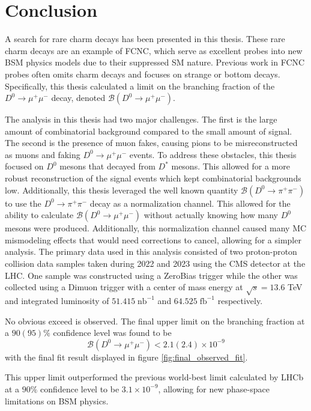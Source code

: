 \chapter{Conclusion}
\label{ch:5}

A search for rare charm decays has been presented in this thesis. These rare charm decays are an example of FCNC, which serve as excellent probes into new BSM physics models due to their suppressed SM nature. Previous work in FCNC probes often omits charm decays and focuses on strange or bottom decays. Specifically, this thesis calculated a limit on the branching fraction of the $D^0 \to \mu^+ \mu^-$ decay, denoted $\mathcal{B}(D^0 \to \mu^+ \mu^-)$. 

The analysis in this thesis had two major challenges. The first is the large amount of combinatorial background compared to the small amount of signal. The second is the presence of muon fakes, causing pions to be misreconstructed as muons and faking $D^0 \to \mu^+ \mu^-$ events. To address these obstacles, this thesis focused on $D^0$ mesons that decayed from $D^*$ mesons. This allowed for a more robust reconstruction of the signal events which kept combinatorial backgrounds low. Additionally, this thesis leveraged the well known quantity $\mathcal{B}(D^0 \to \pi^+ \pi^-)$ to use the $D^0 \to \pi^+ \pi^-$ decay as a normalization channel. This allowed for the ability to calculate $\mathcal{B}(D^0 \to \mu^+ \mu^-)$ without actually knowing how many $D^0$ mesons were produced. Additionally, this normalization channel caused many MC mismodeling effects that would need corrections to cancel, allowing for a simpler analysis. The primary data used in this analysis consisted of two proton-proton collision data samples taken during 2022 and 2023 using the CMS detector at the LHC. One sample was constructed using a ZeroBias trigger while the other was collected using a Dimuon trigger with a center of mass energy at $\sqrt{s} = 13.6$ TeV and integrated luminosity of $51.415\; \text{nb}^{-1}$ and $64.525\; \text{fb}^{-1}$ respectively. 

No obvious exceed is observed. The final upper limit on the branching fraction at a $90(95)\%$ confidence level was found to be 
\begin{equation}
    \mathcal{B}(D^0 \to \mu^+ \mu^-) < 2.1(2.4) \times 10^{-9} 
\end{equation}
with the final fit result displayed in figure \ref{fig:final_observed_fit}. 

This upper limit outperformed the previous world-best limit calculated by LHCb at a $90\%$ confidence level to be $3.1 \times 10^{-9}$, allowing for new phase-space limitations on BSM physics. 

